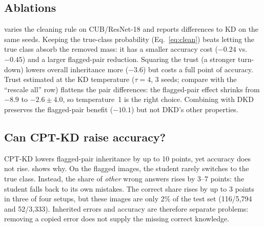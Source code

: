\documentclass[10pt,twocolumn,letterpaper]{article}
\begin{document}
\subsection{Ablations}
 varies the cleaning rule on CUB/ResNet-18 and reports differences to KD on the same seeds. Keeping the true-class probability (Eq.~\ref{eq:clean}) beats letting the true class absorb the removed mass: it has a smaller accuracy cost ($-0.24$ vs.\ $-0.45$) and a larger flagged-pair reduction. Squaring the trust (a stronger turn-down) lowers overall inheritance more ($-3.6$) but costs a full point of accuracy. Trust estimated at the KD temperature ($\tau{=}4$, 3 seeds; compare with the ``rescale all'' row) flattens the pair differences: the flagged-pair effect shrinks from $-8.9$ to $-2.6\pm4.0$, so temperature~1 is the right choice. Combining with DKD preserves the flagged-pair benefit ($-10.1$) but not DKD's other properties.

\begin{table}[t]
\centering\scriptsize
\setlength{\tabcolsep}{2.5pt}
\caption{\textbf{Ablation} on CUB, ResNet-18: difference to vanilla KD on the same seeds (mean $\pm$ std). Negative $\Delta$Inh./$\Delta$Flag. is better.}
\label{tab:ablation}
\resizebox{\linewidth}{!}{}
\end{table}

\subsection{Can CPT-KD raise accuracy?}
\label{sec:acc}
CPT-KD lowers flagged-pair inheritance by up to 10 points, yet accuracy does not rise.  shows why. On the flagged images, the student rarely switches to the true class. Instead, the share of \emph{other} wrong answers rises by 3--7 points: the student falls back to its own mistakes. The correct share rises by up to 3 points in three of four setups, but these images are only 2\% of the test set (116/5{,}794 and 52/3{,}333). Inherited errors and accuracy are therefore separate problems: removing a copied error does not supply the missing correct knowledge.
\end{document}
